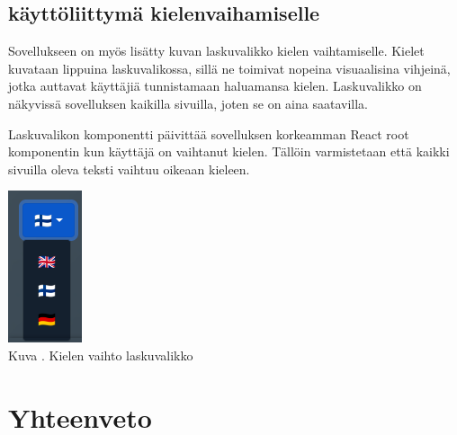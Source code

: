 \documentclass[11pt,a4paper,titlepage,oneside]{article}
\begin{document}
\subsection{käyttöliittymä kielenvaihamiselle}


Sovellukseen on myös lisätty kuvan \nextImageCount{} laskuvalikko kielen vaihtamiselle. 
Kielet kuvataan lippuina laskuvalikossa,
sillä ne toimivat nopeina visuaalisina vihjeinä, jotka auttavat käyttäjiä tunnistamaan haluamansa kielen.
Laskuvalikko on näkyvissä sovelluksen kaikilla sivuilla, joten se on aina saatavilla.
\medskip



Laskuvalikon komponentti päivittää sovelluksen korkeamman React root komponentin kun käyttäjä on vaihtanut kielen.
Tällöin varmistetaan että kaikki sivuilla oleva teksti vaihtuu oikeaan kieleen.
\medskip


\bigskip
\includegraphics[]{src/public/locale_laskuvalikko.png}\\
Kuva \getImgCount {}. Kielen vaihto laskuvalikko













\newpage
{} %










\newpage
\section{Yhteenveto}             %
\end{document}
